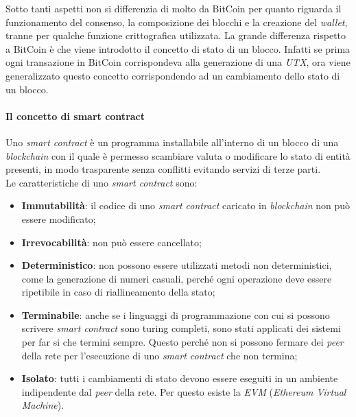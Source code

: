 Sotto tanti aspetti non si differenzia di molto da BitCoin per quanto riguarda il funzionamento del consenso, la composizione dei blocchi e la creazione del \textit{wallet}, tranne per qualche funzione crittografica utilizzata. La grande differenza rispetto a BitCoin è che viene introdotto il concetto di stato di un blocco. Infatti se prima ogni transazione in BitCoin corrispondeva alla generazione di una \textit{UTX}, ora viene generalizzato questo concetto corrispondendo ad un cambiamento dello stato di un blocco.


\paragraph{Il concetto di smart contract} \label{par:ethereum.smart-contract}
Uno \textit{smart contract} è un programma installabile all'interno di un blocco di una \textit{blockchain} con il quale è permesso scambiare valuta o modificare lo stato di entità presenti, in modo trasparente senza conflitti evitando servizi di terze parti. \\

\noindent Le caratteristiche di uno \textit{smart contract} sono:
\begin{itemize}
  \item \textbf{Immutabilità}: il codice di uno \textit{smart contract} caricato in \textit{blockchain} non può essere modificato;
  \item \textbf{Irrevocabilità}: non può essere cancellato;
  \item \textbf{Deterministico}: non possono essere utilizzati metodi non deterministici, come la generazione di numeri casuali, perché ogni operazione deve essere ripetibile in caso di riallineamento della stato;
  \item \textbf{Terminabile}: anche se i linguaggi di programmazione con cui si possono scrivere \textit{smart contract} sono \gls{turing completi}, sono stati applicati dei sistemi per far si che termini sempre. Questo perché non si possono fermare dei \textit{peer} della rete per l'esecuzione di uno \textit{smart contract} che non termina;
  \item \textbf{Isolato}: tutti i cambiamenti di stato devono essere eseguiti in un ambiente indipendente dal \textit{peer} della rete. Per questo esiste la \textit{EVM} (\textit{Ethereum Virtual Machine}).
\end{itemize}

